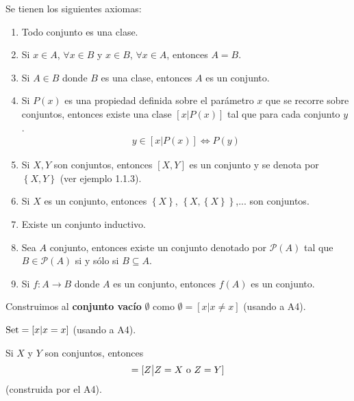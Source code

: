 \documentclass[12pt]{report}
\theoremstyle{largebreak}
\newcommand\cf[3]{\ensuremath{#1:#2\rightarrow#3}}
\begin{document}
    \begin{mydef}
        \renewcommand{\theenumi}{A\arabic{enumi}}
        Se tienen los siguientes axiomas:
        \begin{enumerate}
            \item Todo conjunto es una clase.
            \item Si $x\in A$, $\forall x\in B$ y $x\in B$, $\forall x\in A$, entonces $A=B$.
            \item Si $A\in B$ donde $B$ es una clase, entonces $A$ es un conjunto.
            \item Si $P(x)$ es una propiedad definida sobre el parámetro $x$ que se recorre sobre conjuntos, entonces existe una clase $[x\big| P(x)]$ tal que para cada conjunto $y$.
            \begin{equation*}
                \begin{split}
                    y\in[x\big| P(x)]\iff P(y)
                \end{split}
            \end{equation*}
            \item Si $X,Y$ son conjuntos, entonces $[X,Y]$ es un conjunto y se denota por $\left\{X, Y\right\}$ (ver ejemplo 1.1.3).
            \item Si $X$ es un conjunto, entonces $\left\{X\right\}$, $\left\{X,\left\{X\right\} \right\}$,... son conjuntos.
            \item Existe un conjunto inductivo.
            \item Sea $A$ conjunto, entonces existe un conjunto denotado por $\mathcal{P}(A)$ tal que $B\in\mathcal{P}(A)$ si y sólo si $B\subseteq A$.
            \item Si $\cf{f}{A}{B}$ donde $A$ es un conjunto, entonces $f(A)$ es un conjunto.
        \end{enumerate}
    \end{mydef}

    \begin{exa}
        Construimos al \textbf{conjunto vacío} $\emptyset$ como $\emptyset=[x\big| x\neq x]$ (usando a A4).
    \end{exa}
    
    \begin{exa}
        $\textup{Set}=[x| x=x]$ (usando a A4).
    \end{exa}

    \begin{exa}
        Si $X$ y $Y$ son conjuntos, entonces
        \begin{equation*}
            [X,Y]=[Z\big| Z=X\textup{ o }Z=Y]
        \end{equation*}
        (construida por el A4).
    \end{exa}
\end{document}
